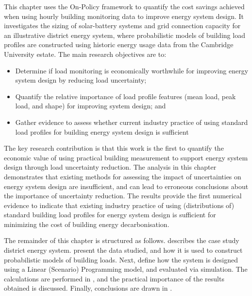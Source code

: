 This chapter uses the On-Policy  framework to quantify the cost savings achieved when using hourly building monitoring data to improve energy system design. It investigates the sizing of solar-battery systems and grid connection capacity for an illustrative district energy system, where probabilistic models of building load profiles are constructed using historic energy usage data from the Cambridge University estate.
The main research objectives are to:
\begin{itemize}
    \item Determine if load monitoring is economically worthwhile for improving energy system design by reducing load uncertainty;
    \item Quantify the relative importance of load profile features (mean load, peak load, and shape) for improving system design; and
    \item Gather evidence to assess whether current industry practice of using standard load profiles for building energy system design is sufficient
\end{itemize}

The key research contribution is that this work is the first to quantify the economic value of using practical building measurement to support energy system design through load uncertainty reduction. The analysis in this chapter demonstrates that existing methods for assessing the impact of uncertainties on energy system design are insufficient, and can lead to erroneous conclusions about the importance of uncertainty reduction. The results provide the first numerical evidence to indicate that existing industry practice of using (distributions of) standard building load profiles for energy system design is sufficient for minimizing the cost of building energy decarbonisation.

The remainder of this chapter is structured as follows.  describes the case study district energy system.  present the data studied, and how it is used to construct probabilistic models of building loads. Next,  define how the system is designed using a Linear (Scenario) Programming model, and evaluated via simulation. The  calculations are performed in , and the practical importance of the results obtained is discussed. Finally, conclusions are drawn in .


\newpage

